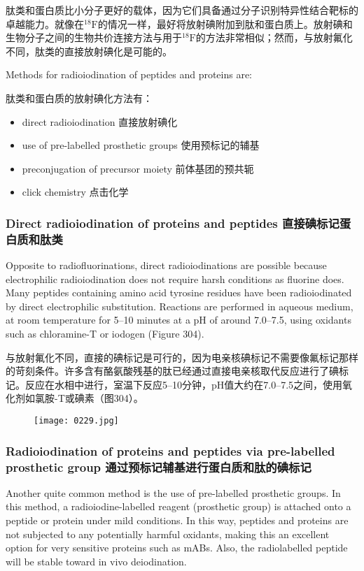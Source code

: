 \documentclass[dvipsnames, svgnames,a4paper,11pt]{article}
\begin{document}
肽类和蛋白质比小分子更好的载体，因为它们具备通过分子识别特异性结合靶标的卓越能力。就像在\(\mathrm{^{18}F}\)的情况一样，最好将放射碘附加到肽和蛋白质上。放射碘和生物分子之间的生物共价连接方法与用于\(\mathrm{^{18}F}\)的方法非常相似；然而，与放射氟化不同，肽类的直接放射碘化是可能的。

Methods for radioiodination of peptides and proteins are:  

肽类和蛋白质的放射碘化方法有：  

\begin{itemize}
  \item direct radioiodination 直接放射碘化
  \item use of pre-labelled prosthetic groups 使用预标记的辅基
  \item preconjugation of precursor moiety 前体基团的预共轭
  \item click chemistry 点击化学
\end{itemize}

\subsubsection{Direct radioiodination of proteins and peptides 直接碘标记蛋白质和肽类}  
Opposite to radiofluorinations, direct radioiodinations are possible because electrophilic radioiodination does not require harsh conditions as fluorine does. Many peptides containing amino acid tyrosine residues have been radioiodinated by direct electrophilic substitution. Reactions are performed in aqueous medium, at room temperature for 5–10 minutes at a pH of around 7.0–7.5, using oxidants such as chloramine-T or iodogen (Figure 304).  

与放射氟化不同，直接的碘标记是可行的，因为电亲核碘标记不需要像氟标记那样的苛刻条件。许多含有酪氨酸残基的肽已经通过直接电亲核取代反应进行了碘标记。反应在水相中进行，室温下反应5–10分钟，pH值大约在7.0–7.5之间，使用氧化剂如氯胺-T或碘素（图304）。  

\begin{figure}[h]
	\centering
    \texttt{[image: 0229.jpg]}  
     \label{fig304}
\end{figure}


\subsubsection{Radioiodination of proteins and peptides via pre-labelled prosthetic group 通过预标记辅基进行蛋白质和肽的碘标记}  
Another quite common method is the use of pre-labelled prosthetic groups. In this method, a radioiodine-labelled reagent (prosthetic group) is attached onto a peptide or protein under mild conditions. In this way, peptides and proteins are not subjected to any potentially harmful oxidants, making this an excellent option for very sensitive proteins such as mABs. Also, the radiolabelled peptide will be stable toward in vivo deiodination.  
\end{document}
